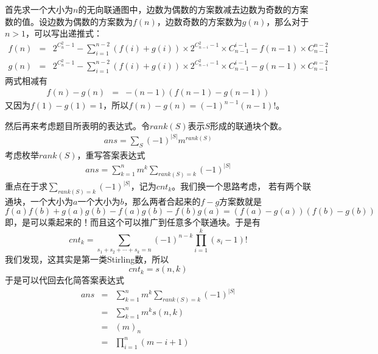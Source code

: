 \documentclass{noithesis}
\begin{document}
首先求一个大小为$n$的无向联通图中，边数为偶数的方案数减去边数为奇数的方案数的值。设边数为偶数的方案数为$f(n)$，边数奇数的方案数为$g(n)$，那么对于$n>1$，可以写出递推式：
\begin{eqnarray*}
f(n) & = & 2^{C_n^2-1} - \sum_{i=1}^{n-2} (f(i) + g(i)) \times 2^{C_{n-i}^2-1} \times C_{n-1}^{i-1} - f(n-1) \times C_{n-1}^{n-2} \\
g(n) & = & 2^{C_n^2-1} - \sum_{i=1}^{n-2} (f(i) + g(i)) \times 2^{C_{n-i}^2-1} \times C_{n-1}^{i-1} - g(n-1) \times C_{n-1}^{n-2}
\end{eqnarray*}
两式相减有
\begin{eqnarray*}
f(n) - g(n) & = & -(n-1)(f(n-1)-g(n-1))
\end{eqnarray*}
又因为$f(1)-g(1)=1$，所以$f(n)-g(n)=(-1)^{n-1}(n-1)!$。\par
然后再来考虑题目所表明的表达式。令$rank(S)$表示$S$形成的联通块个数。
\begin{eqnarray*}
ans = \sum_{S} (-1)^{|S|} m^{rank(S)}
\end{eqnarray*}
考虑枚举$rank(S)$，重写答案表达式
\begin{eqnarray*}
ans = \sum_{k=1}^n m^{k} \sum_{rank(S)=k} (-1)^{|S|}
\end{eqnarray*}
重点在于求$\sum_{rank(S)=k} (-1)^{|S|}$，记为$cnt_k$。我们换一个思路考虑，
若有两个联通块，一个大小为$a$一个大小为$b$，那么两者合起来的$f-g$方案数就是
\[
f(a)f(b)+g(a)g(b)-f(a)g(b)-f(b)g(a)=(f(a)-g(a))(f(b)-g(b))
\]
即，是可以乘起来的！而且这个可以推广到任意多个联通块。于是有
\[
cnt_k = \sum_{s_1+s_2+\cdots+s_k=n} (-1)^{n-k} \prod_{i=1}^k (s_i-1)!
\]
我们发现，这其实是第一类Stirling数，所以
\[
cnt_k = s(n, k)
\]
于是可以代回去化简答案表达式
\begin{eqnarray*}
ans & = & \sum_{k=1}^n m^k \sum_{rank(S)=k} (-1)^{|S|} \\
    & = & \sum_{k=1}^n m^k s(n, k) \\
	& = & (m)_n \\
	& = & \prod_{i=1}^n (m-i+1)
\end{eqnarray*}
\end{document}
